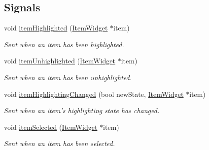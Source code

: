 \subsection*{Signals}
\begin{DoxyCompactItemize}
\item 
void \hyperlink{class_u_i_1_1_item_collection_widget_a1c3889ec32d17845274660ea633f3f89}{item\-Highlighted} (\hyperlink{class_u_i_1_1_item_widget}{Item\-Widget} $\ast$item)
\begin{DoxyCompactList}\small\item\em Sent when an item has been highlighted. \end{DoxyCompactList}\item 
void \hyperlink{class_u_i_1_1_item_collection_widget_a1d3ffff967d92bda151b2f16f346eee4}{item\-Unhighlighted} (\hyperlink{class_u_i_1_1_item_widget}{Item\-Widget} $\ast$item)
\begin{DoxyCompactList}\small\item\em Sent when an item has been unhighlighted. \end{DoxyCompactList}\item 
void \hyperlink{class_u_i_1_1_item_collection_widget_a8b5a8ba3499fa9dd0f2be7472388a1bb}{item\-Highlighting\-Changed} (bool new\-State, \hyperlink{class_u_i_1_1_item_widget}{Item\-Widget} $\ast$item)
\begin{DoxyCompactList}\small\item\em Sent when an item's highlighting state has changed. \end{DoxyCompactList}\item 
void \hyperlink{class_u_i_1_1_item_collection_widget_a37817edad8ef60fef7c03212b80e5dec}{item\-Selected} (\hyperlink{class_u_i_1_1_item_widget}{Item\-Widget} $\ast$item)
\begin{DoxyCompactList}\small\item\em Sent when an item has been selected. \end{DoxyCompactList}\end{DoxyCompactItemize}
